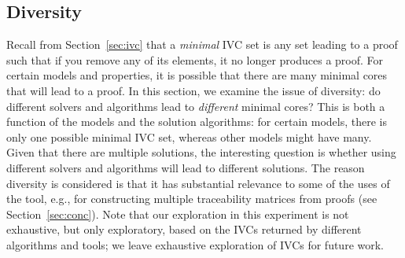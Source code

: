 \subsection{Diversity}
\label{sec:diversity}



Recall from Section~\ref{sec:ivc} that a {\em minimal}
IVC set is any set leading to a proof such that if you remove any of
its elements, it no longer produces a proof. For certain models and
properties, it is possible that there are many minimal cores that will
lead to a proof. In this section, we examine the issue of diversity:
do different solvers and algorithms lead to {\em different} minimal
cores? This is both a function of the models and the solution
algorithms: for certain models, there is only one possible minimal IVC
set, whereas other models might have many. Given that there are
multiple solutions, the interesting question is whether using
different solvers and algorithms will lead to different solutions.
The reason diversity is considered is that it has substantial relevance to
some of the uses of the tool, e.g., for constructing multiple traceability
matrices from proofs (see Section~\ref{sec:conc}).  
Note that our exploration in this experiment is not 
exhaustive, but only exploratory, based on the IVCs returned by different
algorithms and tools; we leave exhaustive exploration of 
IVCs for future work.


